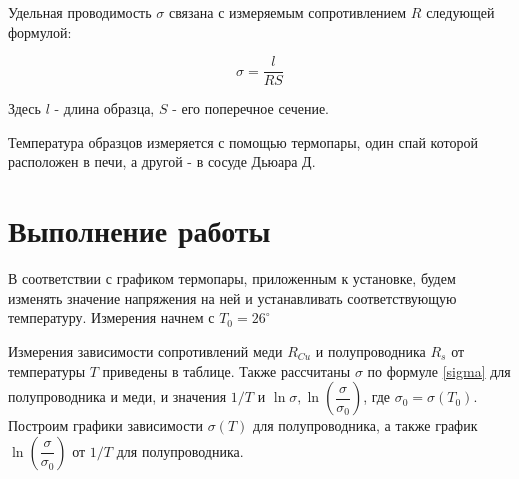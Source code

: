 \documentclass[12pt]{kiarticle}
\begin{document}
	Удельная проводимость $\sigma$ связана с измеряемым сопротивлением $R$ следующей формулой: 
	
\begin{equation}\label{sigma}
	 \sigma = \frac{l}{RS} 
\end{equation}
	
	Здесь $l$ - длина образца, $S$ - его поперечное сечение.
	
	Температура образцов измеряется с помощью термопары, один спай которой расположен в печи, а другой - в сосуде Дьюара Д. 
	
	\section{Выполнение работы}
	
	В соответствии с графиком термопары, приложенным к установке, будем изменять значение напряжения на ней и устанавливать соответствующую температуру. Измерения начнем с $ T_0 = 26^\circ $
	
	Измерения зависимости сопротивлений меди $R_{Cu}$ и полупроводника $R_s$ от температуры $T$ приведены в таблице. Также рассчитаны $ \sigma $ по формуле \eqref{sigma} для полупроводника и меди, и значения $ 1/T$ и $ \ln \sigma, \ln \left( \dfrac{\sigma}{\sigma_0} \right) $, где $ \sigma_0 = \sigma (T_0) $. Построим графики зависимости $ \sigma (T) $ для полупроводника, а также график $ \ln \left( \dfrac{\sigma}{\sigma_0} \right) $ от $ 1/T $ для полупроводника. 
	
\end{document}
